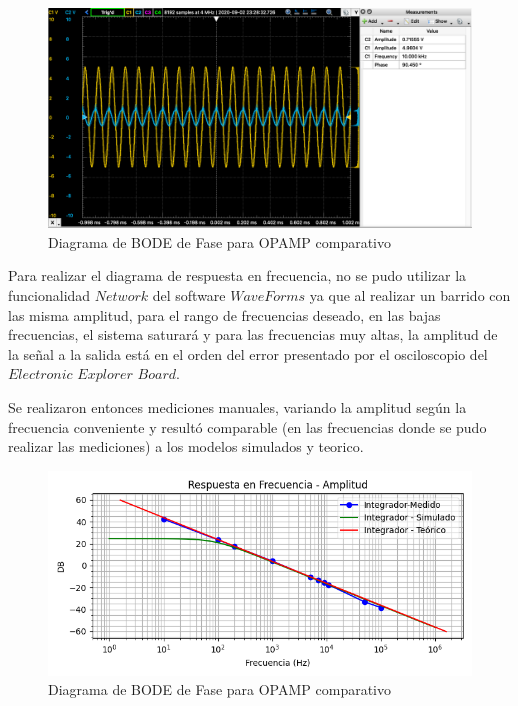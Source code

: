 \begin{figure}[H]
    \centering 
    \includegraphics [scale=0.4] {../Ejercicio3-CircuitoIntegradoresyDerivadores/Imagenes/senoidal - 10000.png} 
    \caption{Diagrama de BODE de Fase para OPAMP comparativo }
    \label{fig:emptyPlotTool}
\end{figure}

Para realizar el diagrama de respuesta en frecuencia, no se pudo utilizar la funcionalidad $Network$ del software $WaveForms$ ya que al realizar un barrido
con las misma amplitud, para el rango de frecuencias deseado, en las bajas frecuencias, el sistema saturará y para las frecuencias muy altas, la amplitud de la señal a la salida
está en el orden del error presentado por el osciloscopio del $Electronic$ $Explorer$ $Board$.

Se realizaron entonces mediciones manuales, variando la amplitud según la frecuencia conveniente y resultó comparable (en las frecuencias donde se pudo realizar las mediciones)
a los modelos simulados y teorico.

\begin{figure}[H]
    \centering 
    \includegraphics [scale=1] {../Ejercicio3-CircuitoIntegradoresyDerivadores/Imagenes/entrada-senoidal-amplitud.png} 
    \caption{Diagrama de BODE de Fase para OPAMP comparativo }
    \label{fig:emptyPlotTool}
\end{figure}

